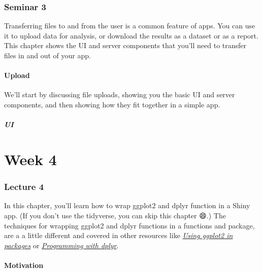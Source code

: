 \documentclass[
]{article}
\begin{document}
\hypertarget{seminar3}{%
\section{Seminar 3}\label{seminar3}}

Transferring files to and from the user is a common feature of apps.
You can use it to upload data for analysis, or download the results as a dataset or as a report.
This chapter shows the UI and server components that you'll need to transfer files in and out of your app.

\hypertarget{upload}{%
\subsection{Upload}\label{upload}}

We'll start by discussing file uploads, showing you the basic UI and server components, and then showing how they fit together in a simple app.

\hypertarget{ui}{%
\subsubsection{UI}\label{ui}}

\hypertarget{part-week-4}{%
\part*{Week 4}\label{part-week-4}}

\hypertarget{lecture4}{%
\section{Lecture 4}\label{lecture4}}

In this chapter, you'll learn how to wrap ggplot2 and dplyr function in a Shiny app.
(If you don't use the tidyverse, you can skip this chapter 😄.) The techniques for wrapping ggplot2 and dplyr functions in a functions and package, are a a little different and covered in other resources like \href{http://ggplot2.tidyverse.org/dev/articles/ggplot2-in-packages.html}{\emph{Using ggplot2 in packages}} or \href{http://dplyr.tidyverse.org/articles/programming.html}{\emph{Programming with dplyr}}.

\hypertarget{tidy-motivation}{%
\subsection{Motivation}\label{tidy-motivation}}
\end{document}
